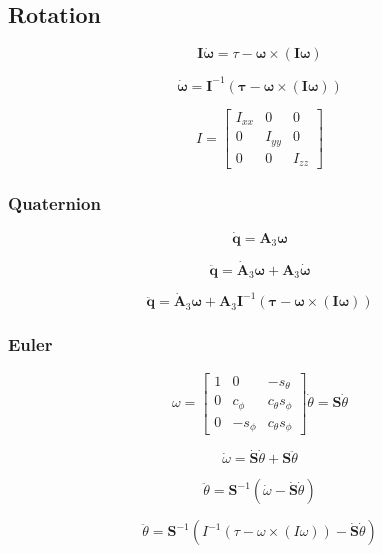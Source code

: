 \subsection{Rotation}

\[
\mathbf{I} \dot{\boldsymbol\omega}
= \tau - \boldsymbol\omega \times \left( \mathbf{I} \boldsymbol\omega \right)
\]

\[
\dot{\boldsymbol\omega}
= \mathbf{I}^{-1} \left( \boldsymbol\tau - \boldsymbol\omega \times \left( \mathbf{I} \boldsymbol\omega \right) \right)
\]

\[
I =
\begin{bmatrix}
I_{xx} & 0 & 0 \\
0 & I_{yy} & 0 \\
0 & 0 & I_{zz}
\end{bmatrix}
\]

\subsubsection{Quaternion}


\[
\dot{\mathbf{q}} = \mathbf{A}_3 \boldsymbol\omega
\]

\[
\ddot{\mathbf{q}} = \dot{\mathbf{A}}_3 \boldsymbol\omega + \mathbf{A}_3 \dot{\boldsymbol\omega}
\]

\[
\ddot{\mathbf{q}}
= \dot{\mathbf{A}}_3 \boldsymbol\omega
+ \mathbf{A}_3 \mathbf{I}^{-1} \left( \boldsymbol\tau - \boldsymbol\omega \times \left( \mathbf{I} \boldsymbol\omega \right) \right)
\]

\subsubsection{Euler}

\[
\omega
=
\begin{bmatrix}
1 & 0		& -s_{\theta} \\
0 & c_{\phi}	& c_{\theta} s_{\phi} \\
0 & -s_{\phi}	& c_{\theta} s_{\phi}
\end{bmatrix}
\dot{\theta} 
= \mathbf{S} \dot{\theta}
\]

\[
\dot{\omega} = \dot{\mathbf{S}} \dot{\theta} + \mathbf{S} \ddot{\theta}
\]

\[
\ddot{\theta} =
\mathbf{S}^{-1} \left( \dot{\omega} - \dot{\mathbf{S}} \dot{\theta} \right)
\]

\begin{equation}
\ddot{\theta} =
\mathbf{S}^{-1} \left( I^{-1} \left( \tau - \omega \times \left( I \omega \right) \right) - \dot{\mathbf{S}} \dot{\theta} \right)
\label{eq:eom_theta}
\end{equation}



